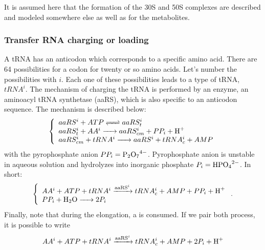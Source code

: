It is assumed here that the formation of the 30S and 50S complexes are described and modeled somewhere else as well as for the metabolites.



\subsubsection{Transfer RNA charging or loading}
A tRNA has an anticodon which corresponds to a specific amino acid. There are 64 possibilities for a codon for twenty or so amino acids. Let's number the possibilities with $i$. Each one of these possibilities leads to a type of tRNA, $tRNA^i$. The mechanism of charging the tRNA is performed by an enzyme, an aminoacyl tRNA synthetase (aaRS), which is also specific to an anticodon sequence. The mechanism is described below:
$$
  \left\{
    \begin{array}{l}
      \reactionRev{aaRS^i + ATP}{aaRS^i_t}{}{} \\
      \reactionIrr{aaRS^i_t + AA^i}{aaRS^i_{cm}+PP_i+\ce{H+}}{}{} \\
      \reactionIrr{aaRS^i_{cm} + tRNA^i}{aaRS^i + tRNA^i_c + AMP}{}{} \\
    \end{array}
  \right.
$$
with the pyrophosphate anion $PP_i=\ce{P2O7^4-}$. Pyrophosphate anion is unstable in aqueous solution and hydrolyzes into inorganic phosphate $P_i=\ce{HPO4^2-}$. In short:
$$
  \left\{
    \begin{array}{l}
    \reactionIrr{AA^i+ATP+tRNA^i}{tRNA^i_c+AMP+PP_i+\ce{H+}}{aaRS^i}{} \\
    \reactionIrr{PP_i + \ce{H2O}}{2P_i}{}{} \\
  \end{array}
  \right. .
$$
Finally, note that during the elongation, a  is consumed. If we pair both process, it is possible to write
$$
  \reactionIrr{AA^i+ATP+tRNA^i}{tRNA^i_c+AMP+2P_i+\ce{H+}}{aaRS^i}{} \\
$$







